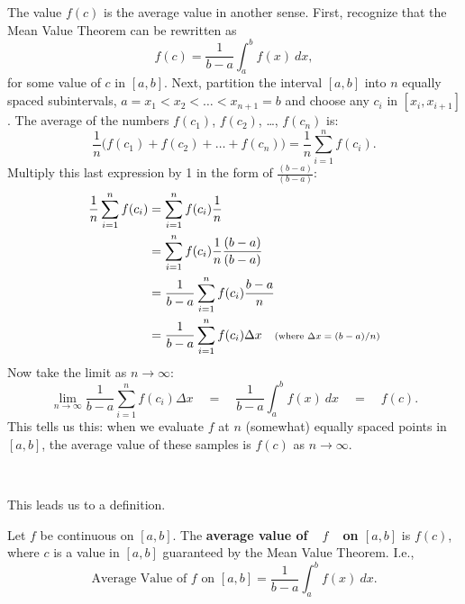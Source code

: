The value $f(c)$ is the average value in another sense. First, recognize that the Mean Value Theorem can be rewritten as 
\[
f(c) = \frac{1}{b-a}\int_a^b f(x)\ dx,
\]
 for some value of $c$ in $[a,b]$. Next, partition the interval $[a,b]$ into $n$ equally spaced subintervals, $a=x_1 < x_2 < \ldots < x_{n+1}=b$ and choose any $c_i$ in $[x_i,x_{i+1}]$. The average of the numbers $f(c_1)$, $f(c_2)$, \ldots, $f(c_n)$ is:
	\[
	\frac1n\Big(f(c_1) + f(c_2) + \ldots + f(c_n)\Big) = \frac1n\sum_{i=1}^n f(c_i).
	\]
 Multiply this last expression by 1 in the form of $\frac{(b-a)}{(b-a)}$:
	\begin{align*}
	\frac1n\sum_{i=1}^n f(c_i) &= \sum_{i=1}^n f(c_i)\frac1n \\
									&= \sum_{i=1}^n f(c_i)\frac1n \frac{(b-a)}{(b-a)} \\
									&= \frac{1}{b-a} \sum_{i=1}^n f(c_i)\frac{b-a}n  \\
									&=\frac{1}{b-a} \sum_{i=1}^n f(c_i)\Delta x\quad \text{\scriptsize (where $\Delta x = (b-a)/n$)} %
	\end{align*}
Now take the limit as $n\to\infty$:
		\[
		\lim_{n\to\infty} \frac{1}{b-a} \sum_{i=1}^n f(c_i)\Delta x\quad  = \quad \frac{1}{b-a} \int_a^b f(x)\ dx\quad = \quad  f(c).
		\]
This tells us this: when we evaluate $f$ at $n$ (somewhat) equally spaced points in $[a,b]$, the average value of these samples is $f(c)$ as $n\to\infty$.


{%
{\hfill {}}
} %
{%
{\\ \noindent {}}
}%

This leads us to a definition.

{Let $f$ be continuous on $[a,b]$. The \textbf{average value of\ \ $f$\ \ on $[a,b]$} is $f(c)$, where $c$ is a value in $[a,b]$ guaranteed by the Mean Value Theorem. I.e., 
\[
\text{Average Value of $f$ on $[a,b]$} = \frac{1}{b-a}\int_a^b f(x)\ dx.
\]
}

